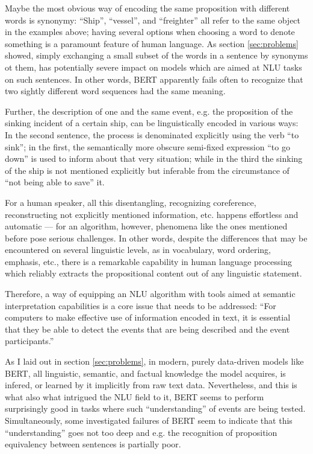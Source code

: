 Maybe the most obvious way of encoding the same proposition with different words is synonymy:
``Ship'', ``vessel'', and ``freighter'' all refer to the same object in the examples above;
having several options when choosing a word to denote something is a paramount feature of human
language. As section \ref{sec:problems} showed, simply exchanging a small subset of the words
in a sentence by synonyms ot them, has potentially severe impact on models which are aimed at
NLU tasks on such sentences. In other words, BERT apparently fails often to recognize that two
sightly different word sequences had the same meaning.

Further, the description of one and the same event, e.g. the proposition of the sinking incident
of a certain ship, can be linguistically encoded in various ways: In the second sentence, the
process is denominated explicitly using the verb ``to sink''; in the first, the semantically more
obscure semi-fixed expression ``to go down'' is used to inform about that very situation; while in
the third the sinking of the ship is not mentioned explicitly but inferable from the circumstance
of ``not being able to save'' it.

For a human speaker, all this disentangling, recognizing coreference, reconstructing
not explicitly mentioned information, etc. happens effortless and automatic --- for an
algorithm, however, phenomena like the ones mentioned before pose serious challenges. In
other words, despite the differences that may be encountered on several linguistic levels, as in
vocabulary, word ordering, emphasis, etc., there is a remarkable capability in human
language processing which reliably extracts the propositional content out of any
linguistic statement.

Therefore, a way of equipping an NLU algorithm with tools aimed at semantic interpretation
capabilities is a core issue that needs to be addressed: ``For computers to make effective
use of information encoded in text, it is essential that they be able to detect the events
that are being described and the event participants.'' \citep{palmer2010semantic}

As I laid out in section \ref{sec:problems}, in modern, purely data-driven models like
BERT, all linguistic, semantic, and factual knowledge the model acquires, is infered,
or learned by it implicitly from raw text data. Nevertheless, and this is what also
what intrigued the NLU field to it, BERT seems to perform surprisingly good in tasks
where such ``understanding'' of events are being tested. Simultaneously, some
investigated failures of BERT seem to indicate that this ``understanding'' goes not too
deep and e.g. the recognition of proposition equivalency between sentences is partially
poor.

